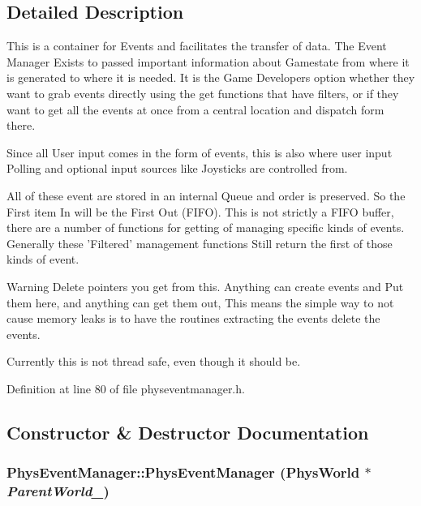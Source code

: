 \subsection{Detailed Description}
This is a container for Events and facilitates the transfer of data. The Event Manager Exists to passed important information about Gamestate from where it is generated to where it is needed. It is the Game Developers option whether they want to grab events directly using the get functions that have filters, or if they want to get all the events at once from a central location and dispatch form there. \par
 Since all User input comes in the form of events, this is also where user input Polling and optional input sources like Joysticks are controlled from. \par
 All of these event are stored in an internal Queue and order is preserved. So the First item In will be the First Out (FIFO). This is not strictly a FIFO buffer, there are a number of functions for getting of managing specific kinds of events. Generally these 'Filtered' management functions Still return the first of those kinds of event. \begin{DoxyWarning}{Warning}
Delete pointers you get from this. Anything can create events and Put them here, and anything can get them out, This means the simple way to not cause memory leaks is to have the routines extracting the events delete the events. 

Currently this is not thread safe, even though it should be. 
\end{DoxyWarning}


Definition at line 80 of file physeventmanager.h.

\subsection{Constructor \& Destructor Documentation}
\hypertarget{classPhysEventManager_a1355f36d99de303cec6f3b27cadaa9ff}{
\subsubsection[{PhysEventManager}]{\setlength{\rightskip}{0pt plus 5cm}PhysEventManager::PhysEventManager ({\bf PhysWorld} $\ast$ {\em ParentWorld\_\-})}}
\label{d5/dd7/classPhysEventManager_a1355f36d99de303cec6f3b27cadaa9ff}


